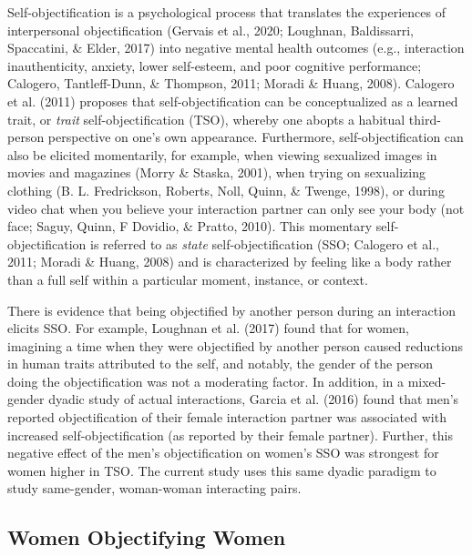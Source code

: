 \documentclass[man]{apa6}
\begin{document}
Self-objectification is a psychological process that translates the
experiences of interpersonal objectification (Gervais et al., 2020;
Loughnan, Baldissarri, Spaccatini, \& Elder, 2017) into negative mental
health outcomes (e.g., interaction inauthenticity, anxiety, lower
self-esteem, and poor cognitive performance; Calogero, Tantleff-Dunn, \&
Thompson, 2011; Moradi \& Huang, 2008). Calogero et al. (2011) proposes
that self-objectification can be conceptualized as a learned trait, or
\emph{trait} self-objectification (TSO), whereby one abopts a habitual
third-person perspective on one's own appearance. Furthermore,
self-objectification can also be elicited momentarily, for example, when
viewing sexualized images in movies and magazines (Morry \& Staska,
2001), when trying on sexualizing clothing (B. L. Fredrickson, Roberts,
Noll, Quinn, \& Twenge, 1998), or during video chat when you believe
your interaction partner can only see your body (not face; Saguy, Quinn,
F Dovidio, \& Pratto, 2010). This momentary self-objectification is
referred to as \emph{state} self-objectification (SSO; Calogero et al.,
2011; Moradi \& Huang, 2008) and is characterized by feeling like a body
rather than a full self within a particular moment, instance, or
context.

There is evidence that being objectified by another person during an
interaction elicits SSO. For example, Loughnan et al. (2017) found that
for women, imagining a time when they were objectified by another person
caused reductions in human traits attributed to the self, and notably,
the gender of the person doing the objectification was not a moderating
factor. In addition, in a mixed-gender dyadic study of actual
interactions, Garcia et al. (2016) found that men's reported
objectification of their female interaction partner was associated with
increased self-objectification (as reported by their female partner).
Further, this negative effect of the men's objectification on women's
SSO was strongest for women higher in TSO. The current study uses this
same dyadic paradigm to study same-gender, woman-woman interacting
pairs.

\subsection{Women Objectifying Women}\label{women-objectifying-women}
\end{document}
